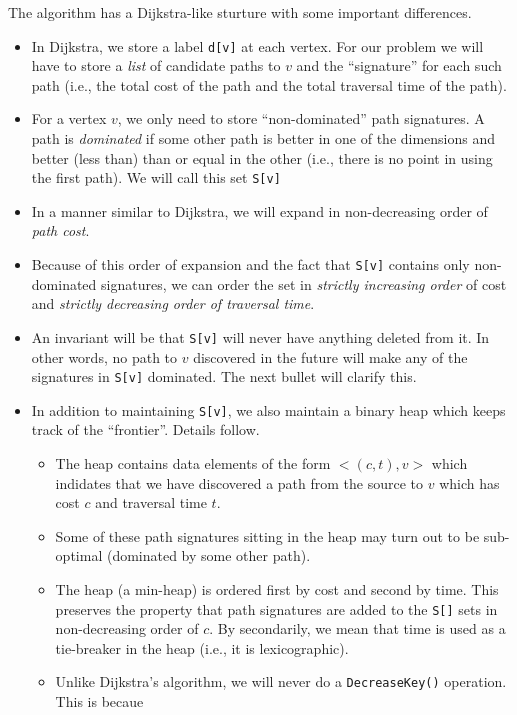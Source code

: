 The algorithm has a Dijkstra-like sturture with some important
differences.

\begin{itemize}
\item In Dijkstra, we store a label \verb+d[v]+ at each vertex.  For
	our problem we will have to store a {\em list} of candidate
	paths to $v$ and the ``signature'' for each such path (i.e.,
	the total cost of the path and the total traversal time
	of the path).  
\item For a vertex $v$, we only need to store ``non-dominated'' path
	signatures.  A path is {\em dominated} if some other path 
	is better in one of the dimensions and better (less than) than or
	equal in the other (i.e., there is no point in using
	the first path).  We will call this set \verb+S[v]+
\item In a manner similar to Dijkstra, we will expand in non-decreasing
	order of {\em path cost}.
\item Because of this order of expansion and the fact that
	\verb+S[v]+ contains only non-dominated signatures, we
	can order the set in {\em strictly increasing order} of
	cost and {\em strictly decreasing order of traversal time}.
\item An invariant will be that \verb+S[v]+ will never have anything
	deleted from it.  In other words, no path to $v$ discovered
	in the future will make any of the signatures in \verb+S[v]+
	dominated.  The next bullet will clarify this.
\item In addition to maintaining \verb+S[v]+,
	we also maintain a binary heap which keeps track of the
	``frontier''.  Details follow.
 	\begin{itemize}
	\item The heap contains data elements of the 
		form $<(c,t),v>$ which indidates that
		we have discovered a path from the
		source to $v$ which has cost $c$ and traversal
		time $t$.
	\item Some of these path signatures sitting in
		the heap may turn out to be sub-optimal
		(dominated by some other path).
	\item The heap (a min-heap) is ordered first by cost and second by
		time.  This preserves the property that path signatures
		are added to the \verb+S[]+ sets in non-decreasing
		order of $c$.  By secondarily, we mean that 
		time is used as a tie-breaker in the heap (i.e.,
		it is lexicographic).
	\item Unlike Dijkstra's algorithm, we will never do a
		\verb+DecreaseKey()+ operation.  This is becaue

\end{itemize}
\end{itemize}
